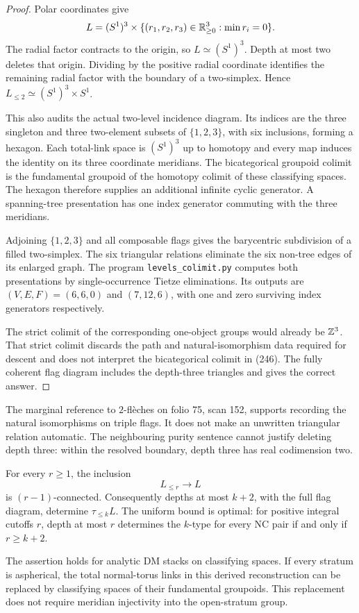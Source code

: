 \begin{proof}
Polar coordinates give
\[
 L=(S^1)^3\times
 \{(r_1,r_2,r_3)\in\mathbb R_{\geq0}^3:\min r_i=0\}.
\]
The radial factor contracts to the origin, so \(L\simeq(S^1)^3\).
Depth at most two deletes that origin. Dividing by the positive radial
coordinate identifies the remaining radial factor with the boundary
of a two-simplex. Hence \(L_{\leq2}\simeq(S^1)^3\times S^1\).

This also audits the actual two-level incidence diagram. Its indices
are the three singleton and three two-element subsets of
\(\{1,2,3\}\), with six inclusions, forming a hexagon. Each total-link
space is \((S^1)^3\) up to homotopy and every map induces the identity
on its three coordinate meridians. The bicategorical groupoid colimit
is the fundamental groupoid of the homotopy colimit of these classifying
spaces. The hexagon therefore supplies an additional infinite cyclic
generator. A spanning-tree presentation has one index generator commuting
with the three meridians.

Adjoining \(\{1,2,3\}\) and all composable flags gives the barycentric
subdivision of a filled two-simplex. The six triangular relations
eliminate the six non-tree edges of its enlarged graph.
The program \texttt{levels\_colimit.py} computes both presentations by
single-occurrence Tietze eliminations. Its outputs are
\((V,E,F)=(6,6,0)\) and \((7,12,6)\), with one and zero surviving
index generators respectively.

The strict colimit of the corresponding one-object groups would already
be \(\mathbb Z^3\). That strict colimit discards the path and natural-isomorphism
data required for descent and does not interpret the bicategorical
colimit in (246). The fully coherent flag diagram includes the
depth-three triangles and gives the correct answer.
\end{proof}

The marginal reference to \(2\)-fl\`eches on folio 75, scan 152,
supports recording the natural isomorphisms on triple flags. It does
not make an unwritten triangular relation automatic. The neighbouring
purity sentence cannot justify deleting depth three: within the
resolved boundary, depth three has real codimension two.

\begin{theorem}\label{P5a2}
For every \(r\geq1\), the inclusion
\[
                         L_{\leq r}\longrightarrow L
\]
is \((r-1)\)-connected. Consequently depths at most \(k+2\), with the
full flag diagram, determine \(\tau_{\leq k}L\). The uniform bound is
optimal: for positive integral cutoffs \(r\), depth at most \(r\)
determines the \(k\)-type for every NC pair if and only if \(r\geq k+2\).

The assertion holds for analytic DM stacks on classifying spaces.
If every stratum is aspherical, the total normal-torus links in this
derived reconstruction can be replaced by classifying spaces of
their fundamental groupoids. This replacement does not require
meridian injectivity into the open-stratum group.
\end{theorem}

